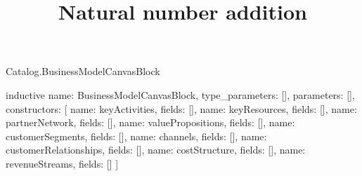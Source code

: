 \begin{lexlean}{Catalog.BusinessModelCanvasBlock}
\title{Natural number addition}
\begin{semanticmodule}
inductive{
  name: BusinessModelCanvasBlock,
  type_parameters: [],
  parameters: [],
  constructors: [
    {name: keyActivities, fields: []},
    {name: keyResources, fields: []},
    {name: partnerNetwork, fields: []},
    {name: valuePropositions, fields: []},
    {name: customerSegments, fields: []},
    {name: channels, fields: []},
    {name: customerRelationships, fields: []},
    {name: costStructure, fields: []},
    {name: revenueStreams, fields: []}
  ]
}
\end{semanticmodule}
\end{lexlean}
